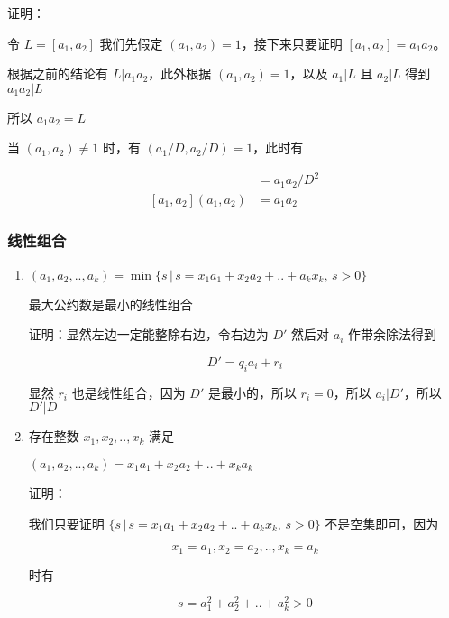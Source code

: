 \documentclass[12pt,a4paper]{ctexart}
\begin{document}
证明：

令 $L=[a_1,a_2]$ 我们先假定 $(a_1,a_2) = 1$，接下来只要证明 $[a_1,a_2] = a_1a_2$。

根据之前的结论有 $L \vert a_1a_2$，此外根据 $(a_1, a_2) = 1$，以及 $a_1 \vert L$ 且 $a_2 \vert L$
得到 $a_1a_2 \vert L$

所以 $a_1a_2 = L$

当 $(a_1,a_2) \ne 1$ 时，有 $(a_1/D, a_2/D) = 1$，此时有

\begin{align*}
[a_1/D, a_2/D] &= a_1a_2/D^2 \\
[a_1, a_2] (a_1, a_2) &= a_1a_2
\end{align*}

\subsubsection{线性组合}

\begin{enumerate}
    \item $(a_1,a_2,..,a_k) = \min \{ s \,\vert\, s = x_1a_1 + x_2a_2 + .. + a_kx_k,\, s > 0 \}$

    最大公约数是最小的线性组合

    证明：显然左边一定能整除右边，令右边为 $D'$ 然后对 $a_i$ 作带余除法得到

    \[
        D' = q_ia_i + r_i
    \]

    显然 $r_i$ 也是线性组合，因为 $D'$ 是最小的，所以 $r_i = 0$，所以 $a_i \vert D'$，所以 $D' \vert D$

    \item 存在整数 $x_1,x_2, .., x_k$ 满足

    $(a_1,a_2,..,a_k) = x_1a_1 + x_2a_2 + .. + x_ka_k$

    证明：

    我们只要证明 $\{ s \,\vert\, s = x_1a_1 + x_2a_2 + .. + a_kx_k,\, s > 0 \}$ 不是空集即可，因为

    \[
        x_1 = a_1, x_2 = a_2, .., x_k =a_k
    \]

    时有

    \[
        s= a_1^2+ a_2^2 + .. + a_k^2 > 0
    \]

\end{enumerate}
\end{document}
